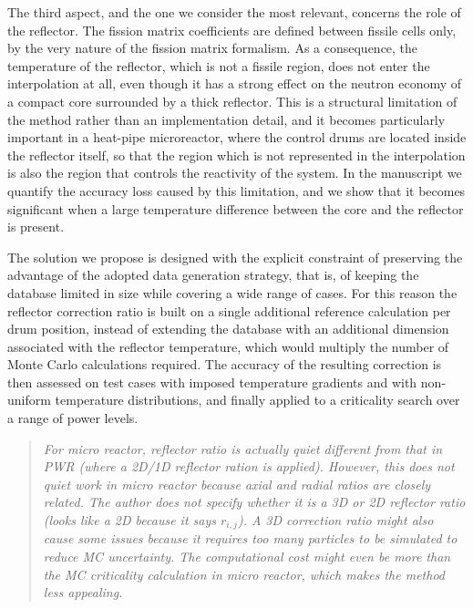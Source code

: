 \documentclass[11pt]{article}
\newenvironment{reviewer}%
  {\medskip\begin{quote}\itshape\color{black!70}}%
  {\end{quote}}
\newcommand{\todo}[1]{\textcolor{red}{\textbf{[DA COMPLETARE: #1]}}}
\begin{document}
The third aspect, and the one we consider the most relevant, concerns the role of the reflector. The fission matrix coefficients are defined between fissile cells only, by the very nature of the fission matrix formalism. As a consequence, the temperature of the reflector, which is not a fissile region, does not enter the interpolation at all, even though it has a strong effect on the neutron economy of a compact core surrounded by a thick reflector. This is a structural limitation of the method rather than an implementation detail, and it becomes particularly important in a heat-pipe microreactor, where the control drums are located inside the reflector itself, so that the region which is not represented in the interpolation is also the region that controls the reactivity of the system. In the manuscript we quantify the accuracy loss caused by this limitation, and we show that it becomes significant when a large temperature difference between the core and the reflector is present.

The solution we propose is designed with the explicit constraint of preserving the advantage of the adopted data generation strategy, that is, of keeping the database limited in size while covering a wide range of cases. For this reason the reflector correction ratio is built on a single additional reference calculation per drum position, instead of extending the database with an additional dimension associated with the reflector temperature, which would multiply the number of Monte Carlo calculations required. The accuracy of the resulting correction is then assessed on test cases with imposed temperature gradients and with non-uniform temperature distributions, and finally applied to a criticality search over a range of power levels.


\begin{reviewer}
For micro reactor, reflector ratio is actually quiet different from that in PWR (where a 2D/1D reflector ration is applied). However, this does not quiet work in micro reactor because axial and radial ratios are closely related. The author does not specify whether it is a 3D or 2D reflector ratio (looks like a 2D because it says $r_{i,j}$). A 3D correction ratio might also cause some issues because it requires too many particles to be simulated to reduce MC uncertainty. The computational cost might even be more than the MC criticality calculation in micro reactor, which makes the method less appealing.
\end{reviewer}
\end{document}
